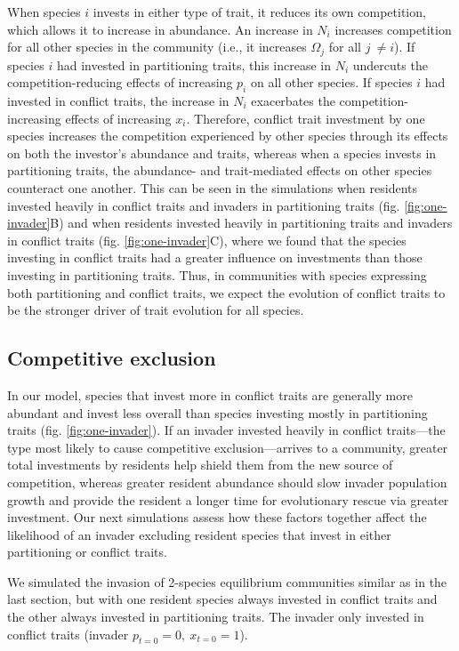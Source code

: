 When species $i$ invests in either type of trait, it reduces its own
competition, which allows it to increase in abundance. An increase in
$N_{i}$ increases competition for all other species in the community
(i.e., it increases $\Omega_{j}$ for all $j\  \neq i$). If species
$i$ had invested in partitioning traits, this increase in $N_{i}$
undercuts the competition-reducing effects of increasing $p_{i}$ on
all other species. If species $i$ had invested in conflict traits, the
increase in $N_{i}$ exacerbates the competition-increasing effects of
increasing $x_{i}$. Therefore, conflict trait investment by one
species increases the competition experienced by other species through
its effects on both the investor's abundance and traits, whereas when a
species invests in partitioning traits, the abundance- and
trait-mediated effects on other species counteract one another. This can
be seen in the simulations when residents invested heavily in conflict
traits and invaders in partitioning traits (fig. \ref{fig:one-invader}B) and when residents
invested heavily in partitioning traits and invaders in conflict traits
(fig. \ref{fig:one-invader}C), where we found that the species investing in conflict traits
had a greater influence on investments than those investing in
partitioning traits. Thus, in communities with species expressing both
partitioning and conflict traits, we expect the evolution of conflict
traits to be the stronger driver of trait evolution for all species.

\subsection*{Competitive exclusion}

In our model, species that invest more in conflict traits are generally more
abundant and invest less overall than species investing mostly in partitioning
traits (fig. \ref{fig:one-invader}). If an invader invested heavily in conflict
traits---the type most likely to cause competitive exclusion---arrives
to a community, greater total investments by residents help shield them from 
the new source of competition, whereas greater resident abundance should 
slow invader population growth and provide the resident a longer time for
evolutionary rescue via greater investment. Our next simulations assess how
these factors together affect the likelihood of an invader excluding resident
species that invest in either partitioning or conflict traits.

We simulated the invasion of 2-species equilibrium communities similar
as in the last section, but with one resident species always invested in
conflict traits and the other always invested in partitioning traits.
The invader only invested in conflict traits (invader
$p_{t = 0} = 0,\ x_{t = 0} = 1$).


